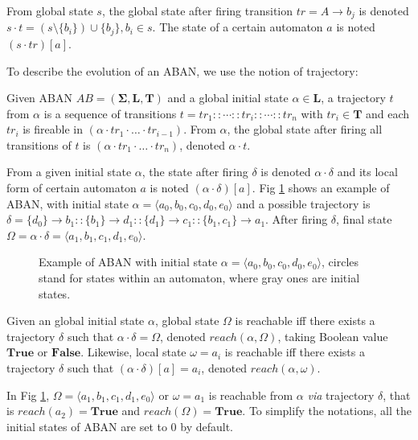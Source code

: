 \documentclass[runningheads]{llncs}
\newcommand{\acm}[3]{\{#1\}\rightarrow#3}
\begin{document}
\begin{definition}[Dynamics]
    From global state $s$, the global state after firing transition $tr=A\to b_j$ is denoted $s \cdot t = (s \setminus \{b_i\}) \cup \{b_j\}, b_i \in s$.
    The state of a certain automaton $a$ is noted $(s\cdot tr)[a]$.
\end{definition}
To describe the evolution of an ABAN, we use the notion of trajectory:
\begin{definition}[Trajectory]
Given ABAN $AB = (\mathbf{\Sigma},\mathbf{L},\mathbf{T})$ and a global initial state $\alpha\in \mathbf{L}$, a trajectory $t$ from $\alpha$ is a sequence of transitions $t=tr_1::\cdots :: tr_i::\cdots ::tr_n$ with $tr_i\in\mathbf{T}$ and each $tr_i$ is fireable in $(\alpha \cdot tr_1 \cdot \ldots \cdot tr_{i-1})$.
From $\alpha$, the global state after firing all transitions of $t$ is $(\alpha \cdot tr_1 \cdot \ldots \cdot tr_n)$, denoted $\alpha \cdot t$.
\end{definition}

From a given initial state $\alpha$, the state after firing $\delta$ is denoted $\alpha\cdot \delta$ and its local form of certain automaton $a$ is noted $(\alpha\cdot \delta)[a]$.
Fig \ref{fig:1} shows an example of ABAN, with initial state $\alpha=\langle a_0,b_0,c_0,d_0,e_0\rangle$ and a possible trajectory is $\delta=\acm{d_0}{b_0}{b_1}::\acm{b_1}{d_0}{d_1}::\acm{d_1}{c_0}{c_1}::\acm{b_1,c_1}{a_0}{a_1}$. After firing $\delta$, final state $\Omega=\alpha\cdot \delta=\langle a_1,b_1,c_1,d_1,e_0\rangle$.

\begin{figure}[ht]
\centering

\caption{Example of ABAN with initial state $\alpha=\langle a_0,b_0,c_0,d_0,e_0\rangle$, circles stand for states within an automaton, where gray ones are initial states.}\label{fig:1}
\end{figure}	

\begin{definition}[Reachability]
Given an global initial state $\alpha$, global state $\Omega$ is reachable iff there exists a trajectory $\delta$ such that $\alpha\cdot \delta=\Omega$, denoted $reach(\alpha, \Omega)$, taking Boolean value $\mathbf{True}$ or $\mathbf{False}$.
Likewise, local state $\omega=a_i$ is reachable iff there exists a trajectory $\delta$ such that $(\alpha\cdot \delta)[a]=a_i$, denoted $reach(\alpha, \omega)$.
\end{definition}

In Fig \ref{fig:1}, $\Omega=\langle a_1,b_1,c_1,d_1,e_0\rangle$ or $\omega=a_1$ is reachable from $\alpha$ \textit{via} trajectory $\delta$, that is $reach(a_2)=\mathbf{True}$ and $reach(\Omega)=\mathbf{True}$.
To simplify the notations, all the initial states of ABAN are set to 0 by default.
\end{document}
